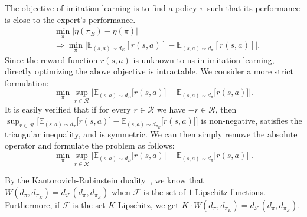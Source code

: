 The objective of imitation learning is to find a policy $\pi$ such that its performance is close to the expert's performance. 
\begin{align*}
& \min_{\pi} \big| \eta(\pi_E) - \eta(\pi) \big| \\ 
& \Rightarrow \min_{\pi} \Big| \mathbb{E}_{(s, a)\sim d_{E}} [r(s, a)] - \mathbb{E}_{(s, a)\sim d_{\pi}} [r(s, a)] \Big|. 
\end{align*} 
Since the reward function $r(s, a)$ is unknown to us in imitation learning, directly optimizing the above objective is intractable. We consider a more strict formulation:
\begin{equation*}
\min_{\pi} \sup_{r\in\mathcal{R}} \Big| \mathbb{E}_{(s, a)\sim d_{E}} \big[r(s, a)\big] - \mathbb{E}_{(s, a)\sim d_{\pi}} \big[r(s, a) \big] \Big|. 
\end{equation*} 
It is easily verified that if for every $r\in \mathcal{R}$ we have $-r \in \mathcal{R}$, then $\sup_{r\in\mathcal{R}} \big[ \mathbb{E}_{(s, a)\sim d_{\pi}} \big[r(s, a)\big] - \mathbb{E}_{(s, a)\sim d_{\pi_E}} \big[r(s, a) \big] \big]$ is non-negative, satisfies the triangular inequality, and is symmetric.
We can then simply remove the absolute operator and formulate the problem as follows:
\begin{equation*}
\min_{\pi} \sup_{r\in\mathcal{R}} \Big[ \mathbb{E}_{(s, a)\sim d_{E}} \big[r(s, a)\big] - \mathbb{E}_{(s, a)\sim d_{\pi}} \big[r(s, a) \big] \Big]. 
\end{equation*} 


By the Kantorovich-Rubinstein duality~\citep{villani2008optimal}, we know that $W(d_{\pi}, d_{\pi_E}) = d_{\mathcal{F}}(d_{\pi}, d_{\pi_E})$ when $\mathcal{F}$ is the set of $1$-Lipschitz functions. Furthermore, if $\mathcal{F}$ is the set $K$-Lipschitz, we get $K\cdot W(d_{\pi}, d_{\pi_E}) = d_{\mathcal{F}}(d_{\pi}, d_{\pi_E})$. 






